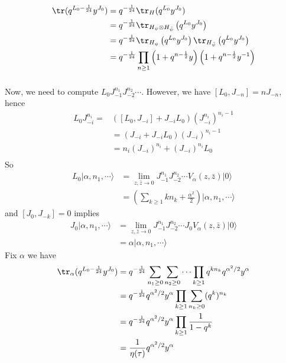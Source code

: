 \begin{equation}
	\begin{split}
	\tr (q^{L_0 - \frac{1}{24}} y^{J_0}) & = q^{-\frac{1}{24}} \tr_{H}(q^{L_0}y^{J_0})\\
	&= q^{-\frac{1}{24}} \tr_{H_\psi \otimes H_{\bar{\psi}}} \left(q^{L_0} y^{J_0} \right)\\
	& = q^{-\frac{1}{24}} \tr_{H_{\psi}}\left(q^{L_0} y^{J_0} \right) \tr_{H_{\bar{\psi}}} \left( q^{L_0} y^{J_0} \right)\\
	& = q^{-\frac{1}{24}} \prod_{n \geq 1} \left(1 + q^{n-\frac{1}{2}} y \right) \left( 1+ q^{n-\frac{1}{2}} y^{-1} \right)
	\end{split}
\end{equation}
\subsubsection{}
Now, we need to compute $L_0 J_{-1}^{n_1} J_{-2}^{n_2} \cdots $. However, we have $[L_0, J_{-n}] = n J_{-n}$, hence
\begin{equation}
	\begin{split}
	L_0 J^{n_i}_{-i} = &\left( [L_0, J_{-i}] + J_{-i}L_0 \right) (J_{-i}^{n_i})^{n_i -1} \\
	& =\left(J_{-i} + J_{-i} L_0\right)(J_{-i})^{n_i -1} \\
	& = n_i (J_{-i})^{n_i} + (J_{-i})^{n_i}L_0\\ 
	\end{split}
\end{equation}
So
\begin{equation}
	\begin{split}
	L_0 |\alpha, n_1, \cdots \rangle &= \lim_{z,\bar{z} \to 0} J_{-1}^{n_1} J_{-2}^{n_2} \cdots V_{\alpha}(z,\bar{z}) |0\rangle \\
	& = \left( \sum_{k\geq 1} k n_k + \frac{\alpha ^2}{2} \right) |\alpha, n_1, \cdots \rangle
	\end{split}
\end{equation}
and $[J_0,J_{-k}] = 0$ implies
\begin{equation}
	\begin{split}
	J_0 |\alpha, n_1, \cdots \rangle & = \lim_{z,\bar{z} \to 0} J_{-1}^{n_1} J_{-2}^{n_2} \cdots J_0 V_{\alpha} (z, \bar{z}) |0\rangle\\
	& =\alpha | \alpha, n_1 ,\cdots \rangle
	\end{split}
\end{equation}
Fix $\alpha$ we have 
\begin{equation}
	\begin{split}
	\tr_\alpha (q^{L_0 - \frac{1}{24}} y^{J_0}) &=  q^{-\frac{1}{24}}\sum_{n_1 \geq 0}\sum_{n_2 \geq 0} \cdots \prod_{k \geq 1} q^{k n_k} q^{\alpha^2/2} y^{\alpha}\\
	& = q^{-\frac{1}{24}} q^{\alpha^2/2}y^{\alpha}\prod_{k \geq 1} \sum_{n_k \geq 0} (q^k)^{n_k}\\
	& =q^{-\frac{1}{24}} q^{\alpha^2/2}y^{\alpha} \prod_{k \geq 1} \frac{1}{1- q^k}\\
	& = \frac{1}{\eta(\tau)} q^{\alpha^2/2}y^{\alpha}
	\end{split}
\end{equation}
